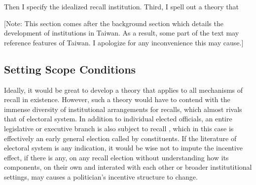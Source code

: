\documentclass[hyphens, crop=false]{standalone}
\begin{document}
	Then I specify the idealized recall institution.
	Third, I spell out a theory that 
	
	
	[Note: This section comes after the background section which details the development of
	institutions in Taiwan. As a result, some part of the text may reference
	features of Taiwan. I apologize for any inconvenience this may cause.]
		\subsection*{Setting Scope Conditions}
		Ideally, it would be great to develop a theory that applies to all mechanisms of recall in existence.
		However, such a theory would have to contend with the immense diversity of 
		institutional arrangements for recalls, which
		almost rivals that of electoral system.
		In addition to individual elected officials,
		an entire legislative or executive branch is also subject to recall
		\autocite{welpRecallReferendumWorld2020},
		which in this case is effectively an early general election called by constituents.
		If the literature of electoral system is any indication, it would be wise not to impute the
		incentive effect,
		if there is any,
		on any recall election without understanding how 
		its components,
		on their own and interated with each other or broader institutitional settings,
		may causes a politician's incentive structure to change.
		
\end{document}
